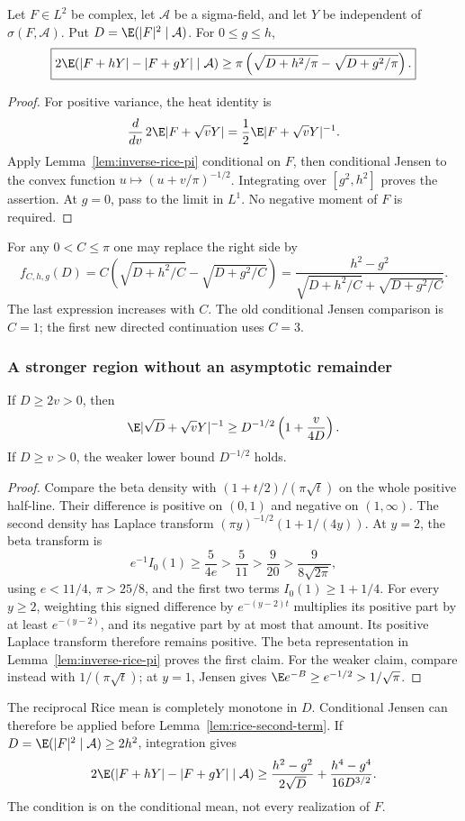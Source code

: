 \begin{theorem}
\label{thm:conditional-heat-pi}
Let \(F\in L^2\) be complex, let \(\mathcal A\) be a sigma-field, and
let \(Y\) be independent of \(\sigma(F,\mathcal A)\).
Put \(D=\E(|F|^2\mid\mathcal A)\).  For \(0\le g\le h\),
\[
\boxed{
2\E(|F+hY|-|F+gY|\mid\mathcal A)
\ge\pi\left(\sqrt{D+h^2/\pi}-\sqrt{D+g^2/\pi}\right).}
\]
\end{theorem}
\begin{proof}
For positive variance, the heat identity is
\[
\frac{d}{dv}\,2\E|F+\sqrt vY|
=\frac12\E|F+\sqrt vY|^{-1}.
\]
Apply Lemma~\ref{lem:inverse-rice-pi} conditional on \(F\), then
conditional Jensen to the convex function
\(u\mapsto(u+v/\pi)^{-1/2}\).  Integrating over
\([g^2,h^2]\) proves the assertion.  At \(g=0\), pass to the limit
in \(L^1\).  No negative moment of \(F\) is required.
\end{proof}
For any \(0<C\le\pi\) one may replace the right side by
\[
f_{C,h,g}(D)=
C\left(\sqrt{D+h^2/C}-\sqrt{D+g^2/C}\right)
=\frac{h^2-g^2}
{\sqrt{D+h^2/C}+\sqrt{D+g^2/C}}.
\]
The last expression increases with \(C\).
The old conditional Jensen comparison is \(C=1\); the first new
directed continuation uses \(C=3\).

\subsubsection{A stronger region without an asymptotic remainder}
\begin{lemma}
\label{lem:rice-second-term}
If \(D\ge2v>0\), then
\[
\E|\sqrt D+\sqrt vY|^{-1}
\ge D^{-1/2}\left(1+\frac{v}{4D}\right).
\]
If \(D\ge v>0\), the weaker lower bound \(D^{-1/2}\) holds.
\end{lemma}
\begin{proof}
Compare the beta density with \((1+t/2)/(\pi\sqrt t)\) on the
whole positive half-line.  Their difference is positive on \((0,1)\)
and negative on \((1,\infty)\).  The second density has Laplace
transform \((\pi y)^{-1/2}(1+1/(4y))\).
At \(y=2\), the beta transform is
\[
e^{-1}I_0(1)\ge\frac5{4e}>
\frac5{11}>\frac9{20}>\frac9{8\sqrt{2\pi}},
\]
using \(e<11/4\), \(\pi>25/8\), and the first two terms
\(I_0(1)\ge1+1/4\).
For every \(y\ge2\), weighting this signed difference by
\(e^{-(y-2)t}\) multiplies its positive part by at least
\(e^{-(y-2)}\), and its negative part by at most that amount.
Its positive Laplace transform therefore remains positive.
The beta representation in Lemma~\ref{lem:inverse-rice-pi} proves
the first claim.  For the weaker claim, compare instead with
\(1/(\pi\sqrt t)\); at \(y=1\), Jensen gives
\(\E e^{-B}\ge e^{-1/2}>1/\sqrt\pi\).
\end{proof}
The reciprocal Rice mean is completely monotone in \(D\).
Conditional Jensen can therefore be applied before
Lemma~\ref{lem:rice-second-term}.  If
\(D=\E(|F|^2\mid\mathcal A)\ge2h^2\), integration gives
\begin{equation}
2\E(|F+hY|-|F+gY|\mid\mathcal A)
\ge \frac{h^2-g^2}{2\sqrt D}
 +\frac{h^4-g^4}{16D^{3/2}}.
\label{eq:rice-heat-two-term}
\end{equation}
The condition is on the conditional mean, not every realization of \(F\).

